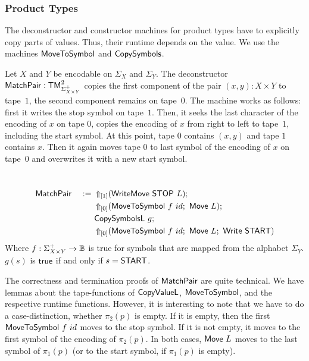 \subsubsection{Product Types}
\label{sec:MatchPair}

The deconstructor and constructor machines for product types have to explicitly copy parts of values.  Thus, their runtime depends on the value.  We
use the machines $\MS{MoveToSymbol}$ and $\MS{CopySymbols}$.

Let $X$ and $Y$ be encodable on $\Sigma_X$ and $\Sigma_Y$.  The deconstructor $\MS{MatchPair} : \TM_{\Sigma_{X \times Y}^+}^2$ copies the first
component of the pair $(x,y):X \times Y$ to tape~$1$, the second component remains on tape~$0$.  The machine works as follows: first it writes the
stop symbol on tape~$1$.  Then, it seeks the last character of the encoding of $x$ on tape $0$, copies the encoding of $x$ from right to left to
tape~$1$, including the start symbol.  At this point, tape $0$ contains $(x,y)$ and tape $1$ contains $x$.  Then it again moves tape $0$ to last
symbol of the encoding of $x$ on tape~$0$ and overwrites it with a new start symbol.

%
\begin{definition}[$\MS{MatchPair}$][MatchPair]
  \label{def:MatchPair}
  ~
  \begin{alignat*}{2}
    &\MS{MatchPair}&~:=~& \LiftTapes{(\MS{WriteMove}~\MS{STOP}~L)}{\Vector{1}} \Seq \\
    &              &    & \LiftTapes{(\MS{MoveToSymbol}~f~id \Seq \MS{Move}~L)}{\Vector{0}} \Seq \\
    &              &    & \MS{CopySymbolsL}~g\Seq \\
    &              &    & \LiftTapes{(\MS{MoveToSymbol}~f~id \Seq \MS{Move}~L \Seq \MS{Write}~\MS{START})}{\Vector{0}}
  \end{alignat*}
  Where $f : \Sigma_{X \times Y}^+ \to \Bool$ is true for symbols that are mapped from the alphabet $\Sigma_Y$.  $g(s)$ is $\true$ if and only if
  $s=\MS{START}$.
\end{definition}

The correctness and termination proofs of $\MS{MatchPair}$ are quite technical.  We have lemmas about the tape-functions of $\MS{CopyValueL}$,
$\MS{MoveToSymbol}$, and the respective runtime functions.  However, it is interesting to note that we have to do a case-distinction, whether
$\pi_2(p)$ is empty.  If it is empty, then the first $\MS{MoveToSymbol}~f~id$ moves to the stop symbol.  If it is not empty, it moves to the first
symbol of the encoding of $\pi_2(p)$.  In both cases, $\MS{Move}~L$ moves to the last symbol of $\pi_1(p)$ (or to the start symbol, if $\pi_1(p)$ is
empty).

